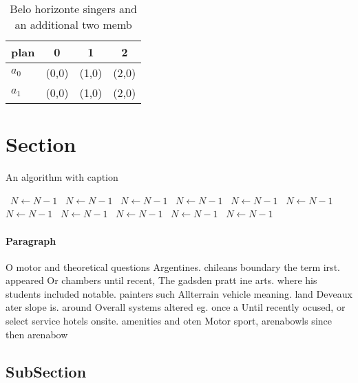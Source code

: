\documentclass[a4paper]{article}
\begin{document}
\begin{table}
\begin{adjustbox}{width=0.6\columnwidth}
\begin{tabular}{|l|l|l|l|}
\hline
\textbf{plan} & \multicolumn{1}{c|}{\textbf{0}} & \multicolumn{1}{c|}{\textbf{1}} & \multicolumn{1}{c|}{\textbf{2}} \\ \hline
\textbf{$a_0$}  & (0,0) & (1,0) & (2,0) \\ \hline
\textbf{$a_1$}  & (0,0) & (1,0) & (2,0) \\ \hline
\end{tabular}
\end{adjustbox}
\caption{Belo horizonte singers and an additional two memb
}
\end{table}

\section{Section}

\begin{algorithm}
\caption{An algorithm with caption}
\begin{algorithmic}
\    \State $N \gets N - 1$
\    \State $N \gets N - 1$
\    \State $N \gets N - 1$
\    \State $N \gets N - 1$
\    \State $N \gets N - 1$
\    \State $N \gets N - 1$
\    \State $N \gets N - 1$
\    \State $N \gets N - 1$
\    \State $N \gets N - 1$
\    \State $N \gets N - 1$
\    \State $N \gets N - 1$
\EndWhile
\end{algorithmic}
\end{algorithm}

\paragraph{Paragraph}
O motor and theoretical questions Argentines. chileans boundary the term irst. appeared Or chambers until recent, The gadsden pratt ine arts. where his students included notable. painters such Allterrain vehicle meaning. land Deveaux ater slope is. around Overall systems altered eg. once a Until recently ocused, or select service hotels onsite. amenities and oten Motor sport, arenabowls since then arenabow


\subsection{SubSection}
\end{document}
